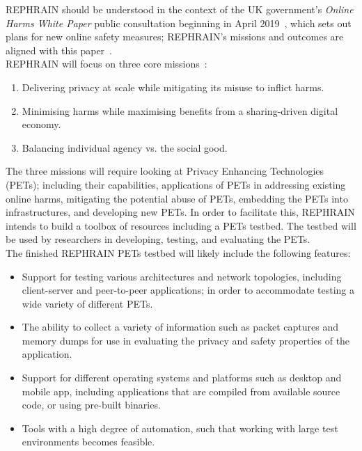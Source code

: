 \documentclass[
    author={Jacob Daniel Halsey},
    supervisor={Prof. Awais Rashid},
    degree={BSc},
    title={Building a Testbed for Evaluating Privacy Enhancing Technologies  (PETs)},
    subtitle={},
    type={software development},
    year={2021}
]{dissertation}
\begin{document}
REPHRAIN should be understood in the context of the UK government's \emph{Online Harms White Paper} public
consultation beginning in April 2019~\cite{uk_gov_online_harms}, which sets out plans for new online safety 
measures; REPHRAIN's missions and outcomes are aligned with this paper~\cite{rephrain_harms}. \\

REPHRAIN will focus on three core missions~\cite{rephrain_missions}:

\begin{enumerate}
	\item Delivering privacy at scale while mitigating its misuse to inflict harms.
	\item Minimising harms while maximising benefits from a sharing-driven digital economy.
	\item Balancing individual agency vs. the social good.
\end{enumerate}

The three missions will require looking at Privacy Enhancing Technologies (PETs); including their capabilities,
applications of PETs in addressing existing online harms, mitigating the potential abuse of PETs, embedding the PETs
into infrastructures, and developing new PETs.
In order to facilitate this, REPHRAIN intends to build a toolbox of resources including a PETs testbed. The testbed
will be used by researchers in developing, testing, and evaluating the PETs.\\

The finished REPHRAIN PETs testbed will likely include the following features:

\begin{itemize}
	\item Support for testing various architectures and network topologies, 
	including client-server and peer-to-peer applications; in order to accommodate 
	testing a wide variety of different PETs.
	\item The ability to collect a variety of information such as packet captures and memory dumps
	for use in evaluating the privacy and safety properties of the application.
	\item Support for different operating systems and platforms such as desktop and mobile app,
	including applications that are compiled from available source code, or using pre-built binaries.
	\item Tools with a high degree of automation, such that working with large test
	environments becomes feasible.
\end{itemize}
\end{document}
